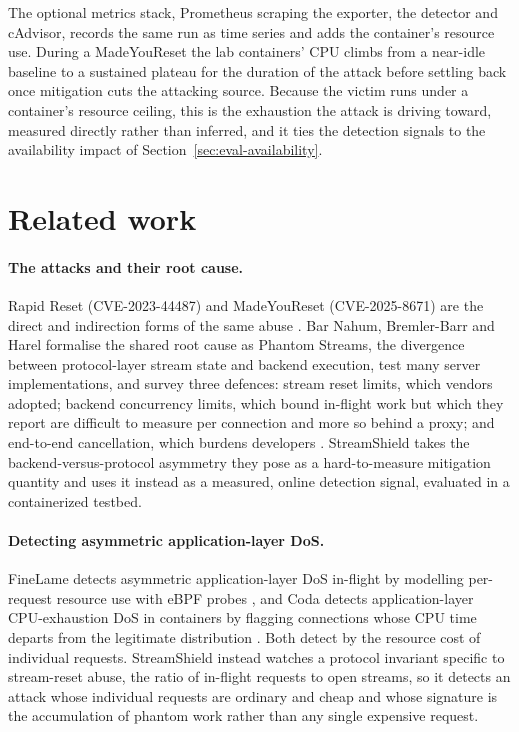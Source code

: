 \documentclass[a4paper,fleqn]{cas-dc}
\begin{document}
The optional metrics stack, Prometheus scraping the exporter, the detector and cAdvisor, records the same run as time series and adds the container's resource use. During a MadeYouReset the lab containers' CPU climbs from a near-idle baseline to a sustained plateau for the duration of the attack before settling back once mitigation cuts the attacking source. Because the victim runs under a container's resource ceiling, this is the exhaustion the attack is driving toward, measured directly rather than inferred, and it ties the detection signals to the availability impact of Section~\ref{sec:eval-availability}.


\section{Related work}\label{sec:related}

\paragraph{The attacks and their root cause.} Rapid Reset (CVE-2023-44487) and MadeYouReset (CVE-2025-8671) are the direct and indirection forms of the same abuse \cite{rapidresetCloudflare,cve20258671}. Bar Nahum, Bremler-Barr and Harel formalise the shared root cause as Phantom Streams, the divergence between protocol-layer stream state and backend execution, test many server implementations, and survey three defences: stream reset limits, which vendors adopted; backend concurrency limits, which bound in-flight work but which they report are difficult to measure per connection and more so behind a proxy; and end-to-end cancellation, which burdens developers \cite{madeyouresetPaper}. StreamShield takes the backend-versus-protocol asymmetry they pose as a hard-to-measure mitigation quantity and uses it instead as a measured, online detection signal, evaluated in a containerized testbed.

\paragraph{Detecting asymmetric application-layer DoS.} FineLame detects asymmetric application-layer DoS in-flight by modelling per-request resource use with eBPF probes \cite{finelame}, and Coda detects application-layer CPU-exhaustion DoS in containers by flagging connections whose CPU time departs from the legitimate distribution \cite{coda}. Both detect by the resource cost of individual requests. StreamShield instead watches a protocol invariant specific to stream-reset abuse, the ratio of in-flight requests to open streams, so it detects an attack whose individual requests are ordinary and cheap and whose signature is the accumulation of phantom work rather than any single expensive request.
\end{document}
